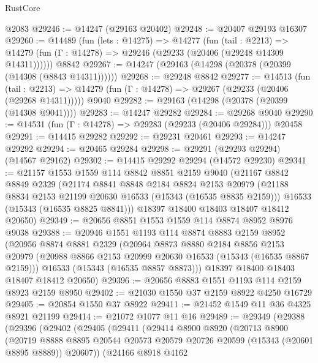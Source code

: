 \begin{lexlean}{RustCore}
\begin{coremodule}
    @2083
@29246 := @14247 (@29163 @20402)
@29248 := @20407 @29193 @16307
@29260 := @14489
    (fun (lets : @14275) =>
    @14277
      (fun (tail : @2213) =>
      @14279 (fun (Γ : @14278) => @29246 (@29233 (@20406 (@29248 @14309 @14311))))))
    @8842
@29267 := @14247 (@29163 (@14298 (@20378 (@20399 (@14308 (@8843 @14311))))))
@29268 := @29248 @8842
@29277 := @14513
    (fun (tail : @2213) => @14279 (fun (Γ : @14278) => @29267 (@29233 (@20406 (@29268 @14311)))))
    @9040
@29282 := @29163 (@14298 (@20378 (@20399 (@14308 @9041))))
@29283 := @14247 @29282
@29284 := @29268 @9040
@29290 := @14531 (fun (Γ : @14278) => @29283 (@29233 (@20406 @29284))) @20458
@29291 := @14415 @29282
@29292 := @29231 @20461
@29293 := @14247 @29292
@29294 := @20465 @29284
@29298 := @29291 (@29293 @29294) (@14567 @29162)
@29302 := @14415 @29292 @29294 (@14572 @29230)
@29341 := @21157
    @1553
    @1559
    @114
    @8842
    @8851
    @2159
    @9040
    (@21167
      @8842
      @8849
      @2329
      (@21174
        @8841
        @8848
        @2184
        @8824
        @2153
        @20979
        (@21188 @8834 @2153 @21199 @20630 @16533 (@15343 (@16535 @8835 @2159)))
        @16533
        (@15343 (@16535 @8825 @8841)))
      @18397
      @18400
      @18403
      @18407
      @18412
      @20650)
@29349 := @20656 @8851 @1553 @1559 @114 @8874 @8952 @8976 @9038
@29388 := @20946
    @1551
    @1193
    @114
    @8874
    @8883
    @2159
    @8952
    (@20956
      @8874
      @8881
      @2329
      (@20964
        @8873
        @8880
        @2184
        @8856
        @2153
        @20979
        (@20988 @8866 @2153 @20999 @20630 @16533 (@15343 (@16535 @8867 @2159)))
        @16533
        (@15343 (@16535 @8857 @8873)))
      @18397
      @18400
      @18403
      @18407
      @18412
      @20650)
@29396 := @20656 @8883 @1551 @1193 @114 @2159 @8923 @2159 @8950
@29402 := @21030 @1550 @37 @2159 @8922 @4250 @16729
@29405 := @20854 @1550 @37 @8922
@29411 := @21452 @1549 @11 @36 @4325 @8921 @21199
@29414 := @21072 @1077 @11 @16
@29489 := @29349
    (@29388
      (@29396
        (@29402
          (@29405
            (@29411
              (@29414
                @8900
                @8920
                (@20713
                  @8900
                  (@20719
                    @8888
                    @8895
                    @20544
                    @20573
                    @20579
                    @20726
                    @20599
                    (@15343 (@20601 @8895 @8889))
                    @20607))
                (@24166
                  @8918
                  @4162

\end{coremodule}
\end{lexlean}

